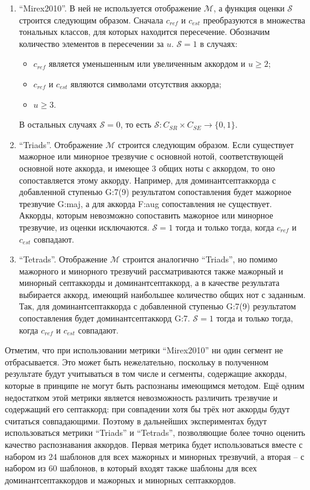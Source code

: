 \begin{enumerate}
  \item ``Mirex2010''. В ней не используется отображение $\mathcal{M}$, а
  функция оценки $\mathcal{S}$ строится следующим образом. Сначала $c_{ref}$ и
  $c_{est}$ преобразуются в множества тональных классов, для которых находится
  пересечение. Обозначим количество элементов в пересечении за $u$.
  $\mathcal{S}=1$ в случаях:
  \begin{itemize}
    \item $c_{ref}$ является уменьшенным или увеличенным аккордом и $u \geq 2$;
    \item $c_{ref}$ и $c_{est}$ являются символами отсутствия аккорда;
    \item $u \geq 3$.
  \end{itemize}
  В остальных случаях $\mathcal{S}=0$, то есть $\mathcal{S}:C_{SR} \times C_{SE}
  \to \{0, 1\}$. 
  \item ``Triads''. Отображение $\mathcal{M}$ строится следующим образом. Если
  существует мажорное или минорное трезвучие с основной нотой, соответствующей
  основной ноте аккорда, и имеющее 3 общих ноты с аккордом, то оно
  сопоставляется этому аккорду. Например, для доминантсептаккорда с добавленной
  ступенью G:7(9) результатом сопоставления будет мажорное трезвучие G:maj, а
  для аккорда F:aug сопоставления не существует. Аккорды, которым невозможно
  сопоставить мажорное или минорное трезвучие, из оценки исключаются.
  $\mathcal{S}=1$ тогда и только тогда, когда $c_{ref}$ и $c_{est}$ совпадают.
  \item ``Tetrads''. Отображение $\mathcal{M}$ строится аналогично ``Triads'',
  но помимо мажорного и минорного трезвучий рассматриваются также мажорный и
  минорный септаккорды и доминантсептаккорд, а в качестве результата выбирается
  аккорд, имеющий наибольшее количество общих нот с заданным. Так, для
  доминантсептаккорда с добавленной ступенью G:7(9) результатом сопоставления
  будет доминантсептаккорд G:7. $\mathcal{S}=1$ тогда и только тогда, когда
  $c_{ref}$ и $c_{est}$ совпадают.
\end{enumerate}

Отметим, что при использовании метрики ``Mirex2010'' ни один сегмент не
отбрасывается. Это может быть нежелательно, поскольку в полученном результате
будут учитываться в том числе и сегменты, содержащие аккорды, которые в принципе
не могут быть распознаны имеющимся методом. Ещё одним недостатком этой метрики
является невозможность различить трезвучие и содержащий его септаккорд: при
совпадении хотя бы трёх нот аккорды будут считаться совпадающими. Поэтому в
дальнейших экспериментах будут использоваться метрики ``Triads'' и ``Tetrads'',
позволяющие более точно оценить качество распознавания аккордов. Первая метрика
будет использоваться вместе с набором из 24 шаблонов для всех мажорных и
минорных трезвучий, а вторая -- с набором из 60 шаблонов, в который входят также
шаблоны для всех доминантсептаккордов и мажорных и минорных септаккордов.

